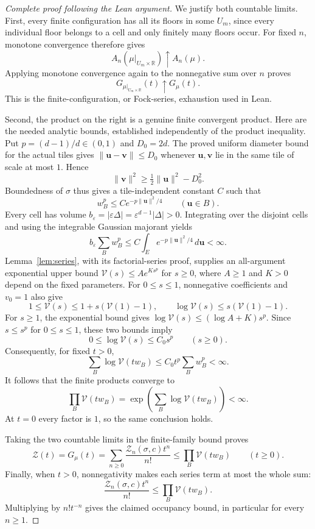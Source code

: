 \begin{proof}[Complete proof following the Lean argument]
We justify both countable limits. First, every finite configuration
has all its floors in some \(U_m\), since every individual floor
belongs to a cell and only finitely many floors occur. For fixed
\(n\), monotone convergence therefore gives
\[
 A_n(\mu|_{U_m\times\mathbb R})\uparrow A_n(\mu).
\]
Applying monotone convergence again to the nonnegative sum over \(n\)
proves
\[
 G_{\mu|_{U_m\times\mathbb R}}(t)\uparrow G_\mu(t).
\]
This is the finite-configuration, or Fock-series, exhaustion used in Lean.

Second, the product on the right is a genuine finite convergent
product. Here are the needed analytic bounds, established independently
of the product inequality. Put \(p=(d-1)/d\in(0,1)\) and \(D_0=2d\).
The proved uniform diameter bound for the actual tiles gives
\(\|\mathbf u-\mathbf v\|\le D_0\) whenever \(\mathbf u,\mathbf v\)
lie in the same tile of scale at most \(1\). Hence
\[
 \|\mathbf v\|^2\ge\tfrac12\|\mathbf u\|^2-D_0^2.
\]
Boundedness of \(\sigma\) thus gives a tile-independent constant \(C\)
such that
\[
       w_B^p\le C e^{-p\|\mathbf u\|^2/4}\qquad(\mathbf u\in B).
\]
Every cell has volume
\(b_\varepsilon=|\varepsilon\Delta|
=\varepsilon^{d-1}|\Delta|>0\). Integrating over the disjoint
cells and using the integrable Gaussian majorant yields
\[
 b_\varepsilon\sum_Bw_B^p
 \le C\int_E e^{-p\|\mathbf u\|^2/4}\,d\mathbf u<\infty.
\]
Lemma~\ref{lem:series}, with its factorial-series proof, supplies an
all-argument exponential upper bound
\(\mathcal V(s)\le A e^{K s^p}\) for \(s\ge0\), where \(A\ge1\)
and \(K>0\) depend on the fixed parameters.
For \(0\le s\le1\), nonnegative coefficients and \(v_0=1\) also give
\[
 1\le\mathcal V(s)\le1+s(\mathcal V(1)-1),\qquad
 \log\mathcal V(s)\le s(\mathcal V(1)-1).
\]
For \(s\ge1\), the exponential bound gives
\(\log\mathcal V(s)\le(\log A+K)s^p\).
Since \(s\le s^p\) for \(0\le s\le1\), these two bounds imply
\[
 0\le\log\mathcal V(s)\le C_0s^p\qquad(s\ge0).
\]
Consequently, for fixed \(t>0\),
\[
 \sum_B\log\mathcal V(tw_B)
       \le C_0t^p\sum_Bw_B^p<\infty.
\]
It follows that the finite products converge to
\[
 \prod_B\mathcal V(tw_B)
   =\exp\!\left(\sum_B\log\mathcal V(tw_B)\right)<\infty.
\]
At \(t=0\) every factor is \(1\), so the same conclusion holds.

Taking the two countable limits in the finite-family bound proves
\[
 \mathcal Z(t)=G_\mu(t)
       =\sum_{n\ge0}\frac{\mathcal Z_n(\sigma,c)t^n}{n!}
       \le\prod_B\mathcal V(tw_B)\qquad(t\ge0).
\]
Finally, when \(t>0\), nonnegativity makes each series term at most
the whole sum:
\[
 \frac{\mathcal Z_n(\sigma,c)t^n}{n!}
       \le\prod_B\mathcal V(tw_B).
\]
Multiplying by \(n!t^{-n}\) gives the claimed occupancy bound,
in particular for every \(n\ge1\).
\end{proof}

